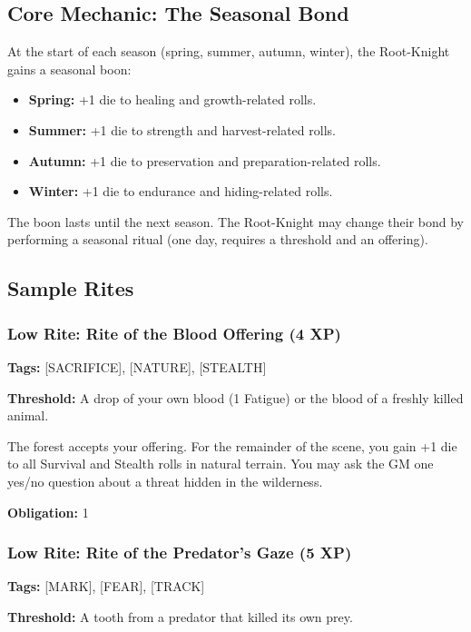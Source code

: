 \subsection{Core Mechanic: The Seasonal Bond}

At the start of each season (spring, summer, autumn, winter), the Root-Knight gains a seasonal boon:

\begin{itemize}
\item \textbf{Spring:} +1 die to healing and growth-related rolls.
\item \textbf{Summer:} +1 die to strength and harvest-related rolls.
\item \textbf{Autumn:} +1 die to preservation and preparation-related rolls.
\item \textbf{Winter:} +1 die to endurance and hiding-related rolls.
\end{itemize}

The boon lasts until the next season. The Root-Knight may change their bond by performing a seasonal ritual (one day, requires a threshold and an offering).

\subsection{Sample Rites}

\subsubsection{Low Rite: Rite of the Blood Offering (4 XP)}

\textbf{Tags:} [SACRIFICE], [NATURE], [STEALTH]

\textbf{Threshold:} A drop of your own blood (1 Fatigue) or the blood of a freshly killed animal.

The forest accepts your offering. For the remainder of the scene, you gain +1 die to all Survival and Stealth rolls in natural terrain. You may ask the GM one yes/no question about a threat hidden in the wilderness.

\textbf{Obligation:} 1

\subsubsection{Low Rite: Rite of the Predator's Gaze (5 XP)}

\textbf{Tags:} [MARK], [FEAR], [TRACK]

\textbf{Threshold:} A tooth from a predator that killed its own prey.

